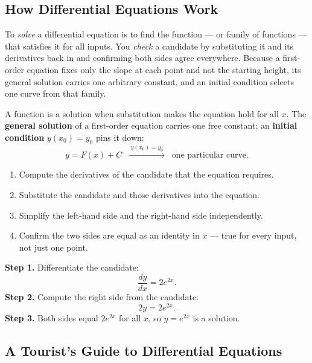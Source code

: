 \subsection{How Differential Equations Work}

To \emph{solve} a differential equation is to find the function --- or family of
functions --- that satisfies it for all inputs. You \emph{check} a candidate by
substituting it and its derivatives back in and confirming both sides agree
everywhere. Because a first-order equation fixes only the slope at each point
and not the starting height, its general solution carries one arbitrary
constant, and an initial condition selects one curve from that family.

\begin{formulabox}
A function is a solution when substitution makes the equation hold for all $x$.
The \textbf{general solution} of a first-order equation carries one free
constant; an \textbf{initial condition} $y(x_0) = y_0$ pins it down:
\[
    y = F(x) + C
    \;\;\xrightarrow{\;y(x_0)=y_0\;}\;\;
    \text{one particular curve.}
\]
\end{formulabox}

\begin{methodbox}
\begin{enumerate}[leftmargin=1.6em, itemsep=2pt]
    \item Compute the derivatives of the candidate that the equation requires.
    \item Substitute the candidate and those derivatives into the equation.
    \item Simplify the left-hand side and the right-hand side independently.
    \item Confirm the two sides are equal as an identity in $x$ --- true for
          every input, not just one point.
\end{enumerate}
\end{methodbox}

\begin{examplebox}[Worked Example 0.2: Verify $y = e^{2x}$ solves $\frac{dy}{dx} = 2y$]
\textbf{Step 1.} Differentiate the candidate:
\[ \frac{dy}{dx} = 2e^{2x}. \]
\textbf{Step 2.} Compute the right side from the candidate:
\[ 2y = 2e^{2x}. \]
\textbf{Step 3.} Both sides equal $2e^{2x}$ for all $x$, so $y = e^{2x}$ is a
solution.
\end{examplebox}

\subsection{A Tourist's Guide to Differential Equations}

